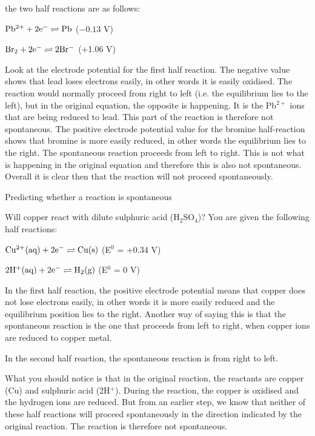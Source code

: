 the two half reactions are as follows:

\begin{center}
$\rm{Pb^{2+} + 2e^{-} \rightleftharpoons Pb}$ ($-0.13$ V)

$\rm{Br_{2} + 2e^{-} \rightleftharpoons 2Br^{-}}$ (+1.06 V)
\end{center}


Look at the electrode potential for the first half reaction. The negative value shows that lead loses electrons easily, in other words it is easily oxidised. The reaction would normally proceed from right to left (i.e. the equilibrium lies to the left), but in the original equation, the opposite is happening. It is the Pb$^{2+}$ ions that are being reduced to lead. This part of the reaction is therefore not spontaneous. The positive electrode potential value for the bromine half-reaction shows that bromine is more easily reduced, in other words the equilibrium lies to the right. The spontaneous reaction proceeds from left to right. This is not what is happening in the original equation and therefore this is also not spontaneous. Overall it is clear then that the reaction will not proceed spontaneously.

\begin{wex}{Predicting whether a reaction is spontaneous}{Will copper react with dilute sulphuric acid (H$_{2}$SO$_{4}$)? You are given the following half reactions:

\begin{center}
$\rm{Cu^{2+}(aq) + 2e^{-} \rightleftharpoons Cu(s)}$ (E$^{0}$ = +0.34 V)

$\rm{2H^{+}(aq) + 2e^{-} \rightleftharpoons H_{2}(g)}$ (E$^{0}$ = 0 V)
\end{center} 
}
{
In the first half reaction, the positive electrode potential means that copper does not lose electrons easily, in other words it is more easily reduced and the equilibrium position lies to the right. Another way of saying this is that the spontaneous reaction is the one that proceeds from left to right, when copper ions are reduced to copper metal.

In the second half reaction, the spontaneous reaction is from right to left.


What you should notice is that in the original reaction, the reactants are copper (Cu) and sulphuric acid (2H$^{+}$). During the reaction, the copper is oxidised and the hydrogen ions are reduced. But from an earlier step, we know that neither of these half reactions will proceed spontaneously in the direction indicated by the original reaction. The reaction is therefore not spontaneous.
}
\end{wex} 

